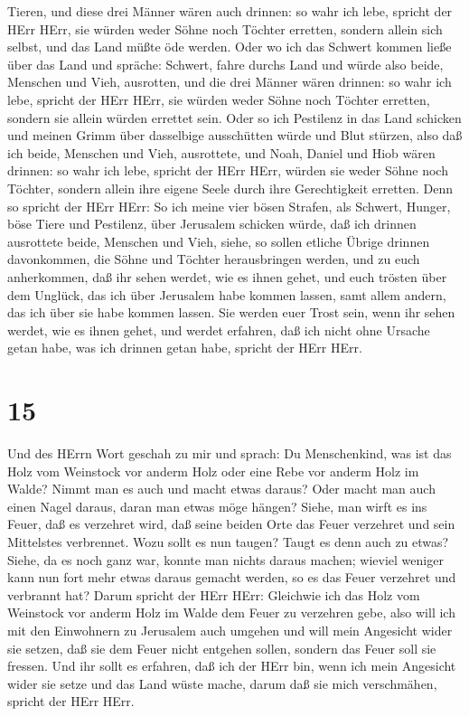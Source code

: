 Tieren,  und diese drei Männer wären auch drinnen: so wahr
ich lebe, spricht der HErr HErr, sie würden weder Söhne noch Töchter
erretten, sondern allein sich selbst, und das Land müßte öde werden.
 Oder wo ich das Schwert kommen ließe über das Land und
spräche: Schwert, fahre durchs Land und würde also beide, Menschen und
Vieh, ausrotten,  und die drei Männer wären drinnen: so
wahr ich lebe, spricht der HErr HErr, sie würden weder Söhne noch
Töchter erretten, sondern sie allein würden errettet sein. 
Oder so ich Pestilenz in das Land schicken und meinen Grimm über
dasselbige ausschütten würde und Blut stürzen, also daß ich beide,
Menschen und Vieh, ausrottete,  und Noah, Daniel und Hiob
wären drinnen: so wahr ich lebe, spricht der HErr HErr, würden sie weder
Söhne noch Töchter, sondern allein ihre eigene Seele durch ihre
Gerechtigkeit erretten.  Denn so spricht der HErr HErr: So
ich meine vier bösen Strafen, als Schwert, Hunger, böse Tiere und
Pestilenz, über Jerusalem schicken würde, daß ich drinnen ausrottete
beide, Menschen und Vieh,  siehe, so sollen etliche Übrige
drinnen davonkommen, die Söhne und Töchter herausbringen werden, und zu
euch anherkommen, daß ihr sehen werdet, wie es ihnen gehet, und euch
trösten über dem Unglück, das ich über Jerusalem habe kommen lassen,
samt allem andern, das ich über sie habe kommen lassen. 
Sie werden euer Trost sein, wenn ihr sehen werdet, wie es ihnen gehet,
und werdet erfahren, daß ich nicht ohne Ursache getan habe, was ich
drinnen getan habe, spricht der HErr HErr.

\hypertarget{section-14}{%
\section{15}\label{section-14}}

 Und des HErrn Wort geschah zu mir und sprach: 
Du Menschenkind, was ist das Holz vom Weinstock vor anderm Holz oder
eine Rebe vor anderm Holz im Walde?  Nimmt man es auch und
macht etwas daraus? Oder macht man auch einen Nagel daraus, daran man
etwas möge hängen?  Siehe, man wirft es ins Feuer, daß es
verzehret wird, daß seine beiden Orte das Feuer verzehret und sein
Mittelstes verbrennet. Wozu sollt es nun taugen? Taugt es denn auch zu
etwas?  Siehe, da es noch ganz war, konnte man nichts daraus
machen; wieviel weniger kann nun fort mehr etwas daraus gemacht werden,
so es das Feuer verzehret und verbrannt hat?  Darum spricht
der HErr HErr: Gleichwie ich das Holz vom Weinstock vor anderm Holz im
Walde dem Feuer zu verzehren gebe, also will ich mit den Einwohnern zu
Jerusalem auch umgehen  und will mein Angesicht wider sie
setzen, daß sie dem Feuer nicht entgehen sollen, sondern das Feuer soll
sie fressen. Und ihr sollt es erfahren, daß ich der HErr bin, wenn ich
mein Angesicht wider sie setze  und das Land wüste mache,
darum daß sie mich verschmähen, spricht der HErr HErr.


